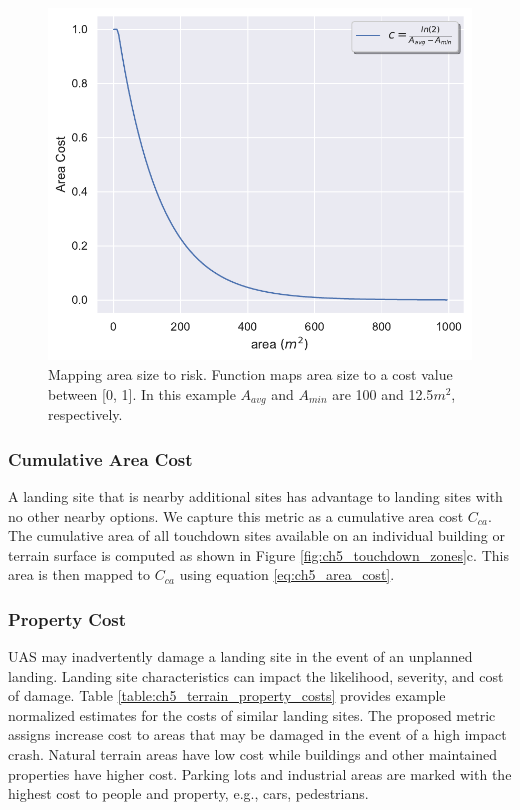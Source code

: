 \begin{figure}[ht]
    \centering
    \includegraphics[clip, trim=0.2cm 0cm 0cm 0cm, width=0.5\linewidth]{chapter_5_mapping/imgs/area_cost.pdf}
    \caption[Mapping area size to risk]{Mapping area size to risk. Function maps area size to a cost value between [0, 1]. In this example $A_{avg}$ and $A_{min}$ are 100 and 12.5$m^2$, respectively. }
    \label{fig:ch5_ny_area_cost}
\end{figure}


\subsubsection{Cumulative Area Cost}
A landing site that is nearby additional sites has advantage to landing sites with no other nearby options. 
We capture this metric as a cumulative area cost $C_{ca}$.  The cumulative area of all touchdown sites available on an individual building or terrain surface is computed as shown in Figure \ref{fig:ch5_touchdown_zones}c.  This area is then mapped to $C_{ca}$ using equation \ref{eq:ch5_area_cost}.

\subsubsection{Property Cost}\label{sec:ch5_property_cost}
\ac{UAS} may inadvertently damage a landing site in the event of an unplanned landing. Landing site characteristics can impact the likelihood, severity, and cost of damage. Table \ref{table:ch5_terrain_property_costs} provides example normalized estimates for the costs of similar landing sites. The proposed metric assigns increase cost to areas that may be damaged in the event of a high impact crash. Natural terrain areas have low cost while buildings and other maintained properties have higher cost. Parking lots and industrial areas are marked with the highest cost to people and property, e.g., cars, pedestrians. %

